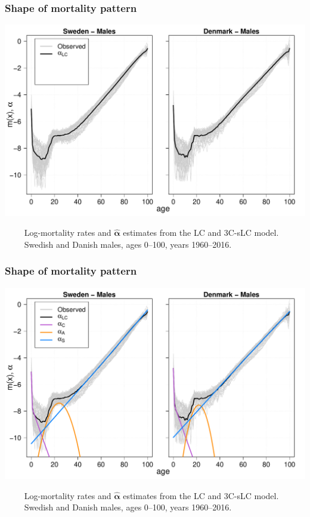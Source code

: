 \documentclass[12pt, xcolor=table]{beamer}  %
\begin{document}
\begin{frame}[noframenumbering]           
	\frametitle{Shape of mortality pattern}
	\begin{center}
		\includegraphics[scale=0.41]{Figures/Ch5/Alpha2}
	\end{center}

\vspace{-0.35cm}
\tiny{$\quad\quad$  Log-mortality rates and $\bm{\hat{\alpha}}$ estimates from the LC and 3C-sLC model. \\ $\quad\quad$ Swedish and Danish males, ages 0--100, years 1960--2016.}
	
\end{frame}

\begin{frame}[noframenumbering]           
	\frametitle{Shape of mortality pattern}
	\begin{center}
		\includegraphics[scale=0.41]{Figures/Ch5/Alpha3}
	\end{center}

\vspace{-0.35cm}
\tiny{$\quad\quad$ Log-mortality rates and $\bm{\hat{\alpha}}$ estimates from the LC and 3C-sLC model. \\ $\quad\quad$ Swedish and Danish males, ages 0--100, years 1960--2016.}
	
\end{frame}
\end{document}
